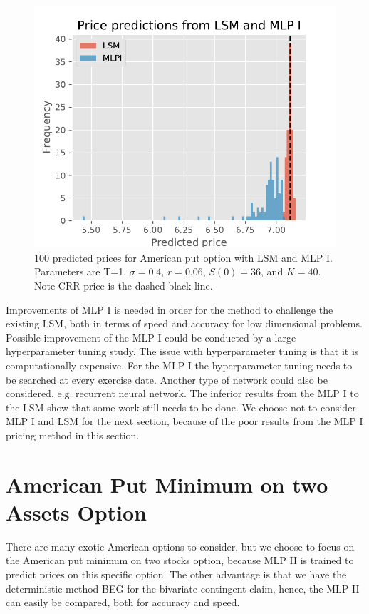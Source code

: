 \begin{figure}[H]
\centering
\includegraphics{Figures/histLSMMLPsI.pdf}
\decoRule
\caption[Price Predictions Histogram]{100 predicted prices for American put option with LSM and MLP I. Parameters are T=1, $\sigma=0.4$, $r=0.06$, $S(0)=36$, and $K=40$. Note CRR price is the dashed black line.}
\label{fig:histLSMMLPI}
\end{figure}

Improvements of MLP I is needed in order for the method to challenge the existing LSM, both in terms of speed and accuracy for low dimensional problems. Possible improvement of the MLP I could be conducted by a large hyperparameter tuning study. The issue with hyperparameter tuning is that it is computationally expensive. For the MLP I the hyperparameter tuning needs to be searched at every exercise date. Another type of network could also be considered, e.g. recurrent neural network. The inferior results from the MLP I to the LSM show that some work still needs to be done. We choose not to consider MLP I and LSM for the next section, because of the poor results from the MLP I pricing method in this section.
\section{American Put Minimum on two Assets Option}\label{bivariateAmerPut}
There are many exotic American options to consider, but we choose to focus on the American put minimum on two stocks option, because MLP II is trained to predict prices on this specific option. The other advantage is that we have the deterministic method BEG for the bivariate contingent claim, hence, the MLP II can easily be compared, both for accuracy and speed.\\


